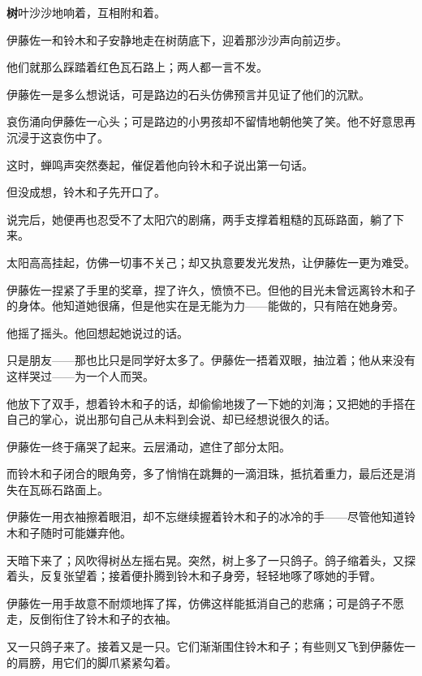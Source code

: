 
\AddSymbolsE
\pagecolor{Periwinkle!30!Gray}
\color{white}
\quad\quad \lettrine[,lraise=0.2,lhang=0.5]{\textbf{树}}{叶}沙沙地响着，互相附和着。

伊藤佐一和铃木和子安静地走在树荫底下，迎着那沙沙声向前迈步。

他们就那么踩踏着红色瓦石路上；两人都一言不发。

伊藤佐一是多么想说话，可是路边的石头仿佛预言并见证了他们的沉默。

哀伤涌向伊藤佐一心头；可是路边的小男孩却不留情地朝他笑了笑。他不好意思再沉浸于这哀伤中了。

这时，蝉鸣声突然奏起，催促着他向铃木和子说出第一句话。

但没成想，铃木和子先开口了。


说完后，她便再也忍受不了太阳穴的剧痛，两手支撑着粗糙的瓦砾路面，躺了下来。

太阳高高挂起，仿佛一切事不关己；却又执意要发光发热，让伊藤佐一更为难受。

伊藤佐一捏紧了手里的奖章，捏了许久，愤愤不已。但他的目光未曾远离铃木和子的身体。他知道她很痛，但是他实在是无能为力——能做的，只有陪在她身旁。

他摇了摇头。他回想起她说过的话。


只是朋友——那也比只是同学好太多了。伊藤佐一捂着双眼，抽泣着；他从来没有这样哭过——为一个人而哭。

他放下了双手，想着铃木和子的话，却偷偷地拨了一下她的刘海；又把她的手搭在自己的掌心，说出那句自己从未料到会说、却已经想说很久的话。


伊藤佐一终于痛哭了起来。云层涌动，遮住了部分太阳。

而铃木和子闭合的眼角旁，多了悄悄在跳舞的一滴泪珠，抵抗着重力，最后还是消失在瓦砾石路面上。

伊藤佐一用衣袖擦着眼泪，却不忘继续握着铃木和子的冰冷的手——尽管他知道铃木和子随时可能嫌弃他。

天暗下来了；风吹得树丛左摇右晃。突然，树上多了一只鸽子。鸽子缩着头，又探着头，反复张望着；接着便扑腾到铃木和子身旁，轻轻地啄了啄她的手臂。

伊藤佐一用手故意不耐烦地挥了挥，仿佛这样能抵消自己的悲痛；可是鸽子不愿走，反倒衔住了铃木和子的衣袖。

又一只鸽子来了。接着又是一只。它们渐渐围住铃木和子；有些则又飞到伊藤佐一的肩膀，用它们的脚爪紧紧勾着。

